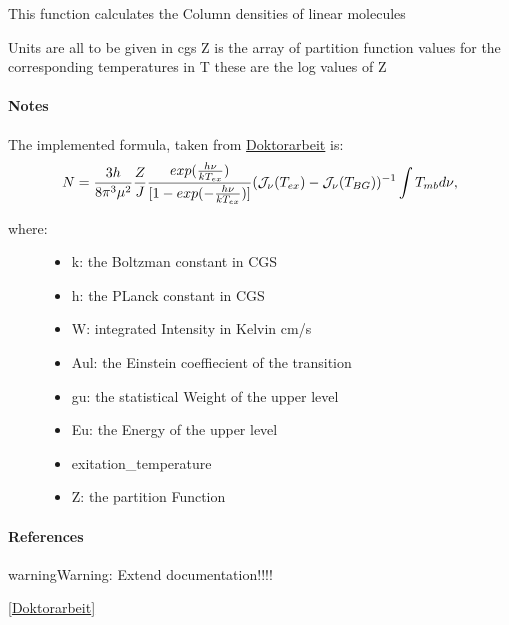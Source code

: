 \documentclass[a4paper,10pt,english]{sphinxmanual}
\begin{document}

\begin{fulllineitems}
\label{lte:astrolyze.lte.lte.lte_column_density}
This function calculates the Column densities of linear molecules

Units are all to be given in cgs
Z is the array of partition function values for the corresponding
temperatures in T these are the log values of Z
\paragraph{Notes}

The implemented formula, taken from {\hyperref[lte:doktorarbeit]{Doktorarbeit}} is:
\begin{gather}
\begin{split}N = \frac{3h}{8 \pi^3 \mu^2} \frac{Z}{J} \frac{exp(\frac{h \nu}{k
T_{ex}})}{[1 - exp(-\frac{h \nu}{k T_{ex}})]} (\mathcal{J}_{\nu}(T_{ex})
- \mathcal{J}_{\nu}(T_{BG}))^{-1} \int{T_{mb} d \nu} ,\end{split}\notag
\end{gather}\begin{description}
\item[{where:}] \leavevmode\begin{itemize}
\item {} 
k: the Boltzman constant in CGS

\item {} 
h: the PLanck constant in CGS

\item {} 
W: integrated Intensity in Kelvin cm/s

\item {} 
Aul: the Einstein coeffiecient of the transition

\item {} 
gu: the statistical Weight of the upper level

\item {} 
Eu: the Energy of the upper level

\item {} 
exitation\_temperature

\item {} 
Z: the partition Function

\end{itemize}

\end{description}
\paragraph{References}

\begin{notice}{warning}{Warning:}
Extend documentation!!!!
\end{notice}

{\hyperref[lte:doktorarbeit]{{[}Doktorarbeit{]}}}

\end{fulllineitems}
\end{document}
